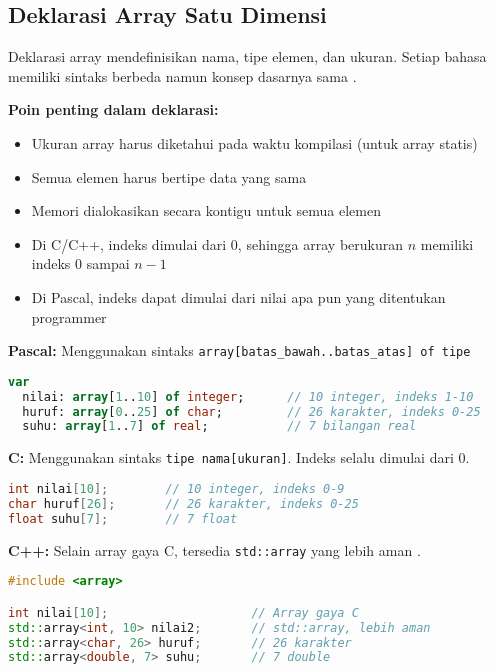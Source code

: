 \documentclass[../main.tex]{subfiles}
\begin{document}
\subsection{Deklarasi Array Satu Dimensi}
Deklarasi array mendefinisikan nama, tipe elemen, dan ukuran. Setiap bahasa memiliki sintaks berbeda namun konsep dasarnya sama \parencite{tutorialspoint-c-arrays,learncpp-arrays,free-pascal-docs,tutorialpemrograman-array-c}.

\textbf{Poin penting dalam deklarasi:}
\begin{itemize}
  \item Ukuran array harus diketahui pada waktu kompilasi (untuk array statis)
  \item Semua elemen harus bertipe data yang sama
  \item Memori dialokasikan secara kontigu untuk semua elemen
  \item Di C/C++, indeks dimulai dari 0, sehingga array berukuran $n$ memiliki indeks 0 sampai $n-1$
  \item Di Pascal, indeks dapat dimulai dari nilai apa pun yang ditentukan programmer
\end{itemize}

\textbf{Pascal:} Menggunakan sintaks \texttt{array[batas\_bawah..batas\_atas] of tipe}
\begin{lstlisting}[language=Pascal, caption={Deklarasi array di Pascal}]
var
  nilai: array[1..10] of integer;      // 10 integer, indeks 1-10
  huruf: array[0..25] of char;         // 26 karakter, indeks 0-25
  suhu: array[1..7] of real;           // 7 bilangan real
\end{lstlisting}

\textbf{C:} Menggunakan sintaks \texttt{tipe nama[ukuran]}. Indeks selalu dimulai dari 0.
\begin{lstlisting}[language=C, caption={Deklarasi array di C}]
int nilai[10];        // 10 integer, indeks 0-9
char huruf[26];       // 26 karakter, indeks 0-25
float suhu[7];        // 7 float
\end{lstlisting}

\textbf{C++:} Selain array gaya C, tersedia \texttt{std::array} yang lebih aman \parencite{cpp-std-array,cppreference-array}.
\begin{lstlisting}[language=C++, caption={Deklarasi array di C++}]
#include <array>

int nilai[10];                    // Array gaya C
std::array<int, 10> nilai2;       // std::array, lebih aman
std::array<char, 26> huruf;       // 26 karakter
std::array<double, 7> suhu;       // 7 double
\end{lstlisting}
\end{document}
